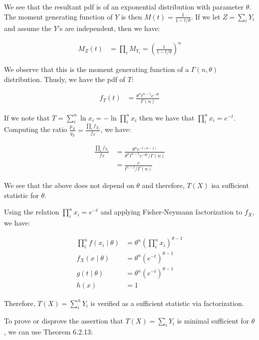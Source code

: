 \documentclass[11pt]{article}
\begin{document}
We see that the resultant pdf is of an exponential distribution with
parameter $\theta$.  The moment generating function of $Y$ is then
$M(t) = \frac{1}{1-t/\theta}$.  If we let $Z = \sum_i Y_i$ and assume
the $Y$'s are independent, then we have:

\begin{align*}
  M_Z(t) &= \prod_i M_{Y_i} = \left( \frac{1}{1-t/\theta} \right)^n
\end{align*}

We observe that this is the moment generating function of a
$\Gamma(n, \theta)$ distribution.  Thusly, we have the pdf of $T$:

\begin{align*}
  f_T(t) &= \frac{\theta^n t^{n-1} e^{-\theta t}}{\Gamma(n)}
\end{align*}

If we note that $T = \sum_i^n \ln{x_i} = -\ln{\prod_i^n x_i}$ then we
have that $\prod_i^n x_i = e^{-t}$.  Computing the ratio
$\frac{p_X}{q_T} = \frac{\prod_i f_{X_i}}{f_T}$, we have:

\begin{align*}
  \frac{\prod_i f_{X_i}}{f_T} &= \frac{\theta^n
                                e^{-t(\theta-1)}}{\theta^n t^{n-1}
                                e^{-\theta t}/\Gamma(n)} \\
  &= \frac{e}{t^{n-1}/\Gamma(n)}
\end{align*}

We see that the above does not depend on $\theta$ and therefore,
$T(X)$ isa sufficient statistic for $\theta$.

Using the relation $\prod_i^n x_i = e^{-t}$ and applying
Fisher-Neymann factorization to $f_X$, we have:

\begin{align*}
  \prod_i^n f(x_i \mid \theta) &= \theta^n \left( \prod_i^n x_i
                                 \right)^{\theta-1} \\
  f_X(x \mid \theta) &= \theta^n \left( e^{-t} \right)^{\theta-1} \\
  g(t \mid \theta) &= \theta^n \left( e^{-t} \right)^{\theta-1} \\
  h(x) &= 1
\end{align*}

Therefore, $T(X) = \sum_i^n Y_i$ is verified as a sufficient
statistic via factorization.

To prove or disprove the assertion that $T(X) = \sum_i Y_i$ is minimal
sufficient for $\theta$, we can use Theorem 6.2.13:
\end{document}
